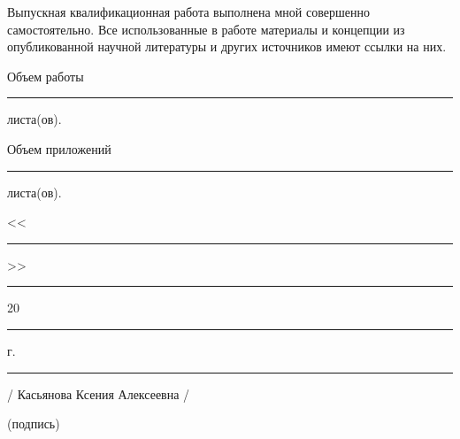 \documentclass[12pt,a4paper, oneside]{extreport}
\begin{document}
\thispagestyle{empty}

Выпускная квалификационная работа выполнена мной совершенно самостоятельно. Все использованные в работе материалы и концепции из опубликованной научной литературы и других источников имеют ссылки на них.

\vspace{2ex}

 Объем работы  \rule{2em}{0.5pt} листа(ов).

\vspace{2ex}

 Объем приложений \rule{2em}{0.5pt} листа(ов).

\vspace{4ex}

\noindent << \rule{1em}{0.5pt} >> \rule{5em}{0.5pt} 20 \rule{1.4em}{0.5pt} г. 

\vspace{4ex}



\noindent \rule{11em}{0.5pt} 
\hspace{8em} / Касьянова Ксения Алексеевна /

\hspace{0.5cm} \footnotesize (подпись)


\end{document}
